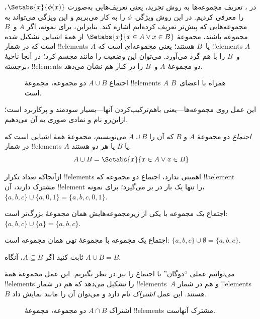 \documentclass[../../../include/open-logic-section]{subfiles}
\begin{document}

\begin{explain}
در ، تعریف مجموعه‌ها به روش تجرید، یعنی
تعریف‌هایی به‌صورت $\Setabs{x}{\phi(x)}$، را معرفی کردیم. در این روش
ویژگی~$\phi$ را به کار می‌بریم و این ویژگی می‌تواند به مجموعه‌هایی که
پیش‌تر تعریف کرده‌ایم اشاره کند. بنابراین، برای نمونه، اگر $A$ و~$B$
مجموعه باشند، مجموعهٔ $\Setabs{x}{x \in A \lor x \in B}$ از همهٔ
اشیایی تشکیل شده است که در شمار !!{element}s $A$ یا~$B$ هستند؛ یعنی
مجموعه‌ای است که !!{element}s $A$ و~$B$ را با هم گرد می‌آورد.
می‌توان این وضعیت را مانند  مجسم کرد؛ در آنجا ناحیهٔ
برجسته، !!{element}s دو مجموعهٔ $A$ و~$B$ را در کنار هم نشان می‌دهد.

\begin{figure}
  \caption{اجتماع $A \cup B$ دو مجموعه، مجموعهٔ !!{element}s
   $A$ همراه با اعضای~$B$ است.}
\end{figure}

این عمل روی مجموعه‌ها---یعنی باهم‌ترکیب‌کردن آنها---بسیار سودمند و
پرکاربرد است؛ ازاین‌رو نام و نمادی صوری به آن می‌دهیم.
\end{explain}

\begin{defn}[اجتماع]
\emph{اجتماع} دو مجموعهٔ $A$ و $B$ که آن را $A \cup B$ می‌نویسیم،
مجموعهٔ همهٔ اشیایی است که در شمار !!{element}s $A$ یا $B$ یا هر دو هستند.
\[
A \cup B = \Setabs{x}{x \in A \lor x \in B}
\]
\end{defn}

\begin{ex}
ازآنجاکه تعداد تکرار !!{element}s اهمیتی ندارد، اجتماع دو مجموعه که
!!a{element} مشترک دارند، آن !!{element} را تنها یک بار در بر می‌گیرد؛
برای نمونه، $\{ a, b, c\} \cup \{ a, 0, 1\} = \{a, b, c, 0, 1\}$.

اجتماع یک مجموعه با یکی از زیرمجموعه‌هایش همان مجموعهٔ بزرگ‌تر است:
$\{a, b, c \} \cup \{a \} = \{a, b, c\}$.

اجتماع یک مجموعه با مجموعهٔ تهی همان مجموعه است: $\{a,
b, c \} \cup \emptyset = \{a, b, c \}$.
\end{ex}

\begin{prob}
ثابت کنید اگر $A \subseteq B$، آنگاه $A \cup B = B$.
\end{prob}

\begin{explain}
می‌توانیم عملی ``دوگان'' با اجتماع را نیز در نظر بگیریم. این عمل
مجموعهٔ همهٔ !!{element}s را تشکیل می‌دهد که هم در شمار !!{element}s~$A$
و هم در شمار !!{element}s~$B$ هستند. این عمل \emph{اشتراک} نام دارد و می‌توان
آن را مانند  نمایش داد.
\begin{figure}
  \caption{اشتراک $A \cap B$ دو مجموعه، مجموعهٔ
    !!{element}s مشترک آنهاست.}
\end{figure}
\end{explain}
\end{document}
